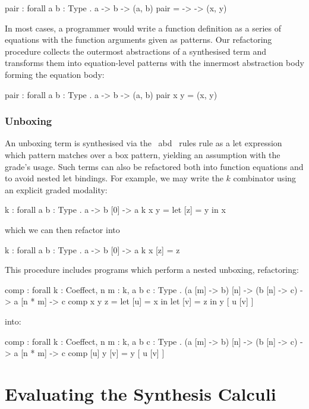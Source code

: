 \begin{granule}
pair : forall { a b : Type } . a -> b -> (a, b)
pair = \x -> \y -> (x, y)
\end{granule}

In most cases, a programmer would write a function definition as a series of
equations with the function arguments given as patterns. Our refactoring
procedure collects the outermost abstractions of a synthesised term and
transforms them into equation-level patterns with the innermost abstraction
body forming the equation body:

\begin{granule}
pair : forall { a b : Type } . a -> b -> (a, b)
pair x y = (x, y)
\end{granule}

\subsubsection{Unboxing}
An unboxing term is synthesised via the \subUnboxName\ abd \addUnboxName\ rules
rule as a let expression which pattern matches over a box pattern, yielding an
assumption with the grade's usage. Such terms can also be refactored both into
function equations and to avoid nested let bindings. For example, we may write
the $k$ combinator using an explicit graded modality:

\begin{granule}
k : forall { a b : Type } . a -> b [0] -> a
k x y = let [z] = y in x
\end{granule}
which we can then refactor into
\begin{granule}
k : forall { a b : Type } . a -> b [0] -> a
k x [z] = z
\end{granule}
This procedure includes programs which perform a nested unboxing, refactoring:
\begin{granule}
comp : forall {k : Coeffect, n m : k, a b c : Type} 
     . (a [m] -> b) [n] 
     -> (b [n] -> c) 
     -> a [n * m] 
     -> c
comp x y z = let [u] = x in let [v] = z in y [ u [v] ]
\end{granule}
into:
\begin{granule}
comp : forall {k : Coeffect, n m : k, a b c : Type}
     . (a [m] -> b) [n] 
     -> (b [n] -> c) 
     -> a [n * m] 
     -> c
comp [u] y [v] = y [ u [v] ]
\end{granule}



\section{Evaluating the Synthesis Calculi}
\label{sec:linear-base-evaluation}

